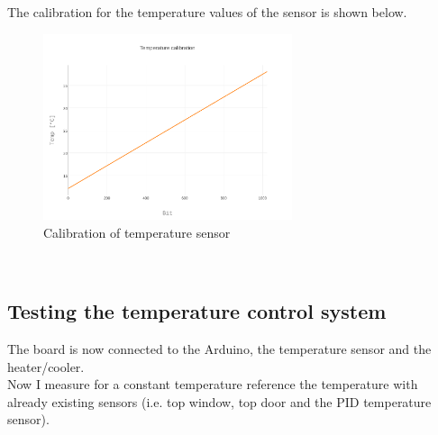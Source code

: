 \documentclass[12pt]{scrartcl}
\begin{document}
      \noindent The calibration for the temperature values of the sensor is shown
      below.
      \begin{figure}[h]
        \centering
        \includegraphics[width = 0.65\textwidth]{./plots/plot_image(4)}
        \caption{Calibration of temperature sensor}
        \label{fig10}
      \end{figure}
      \\
    \subsection{Testing the temperature control system}
      The board is now connected to the Arduino, the temperature sensor and the
      heater/cooler. \\
      Now I measure for a constant temperature reference the temperature with
      already existing sensors (i.e. top window, top door and the PID temperature
      sensor).
\end{document}
